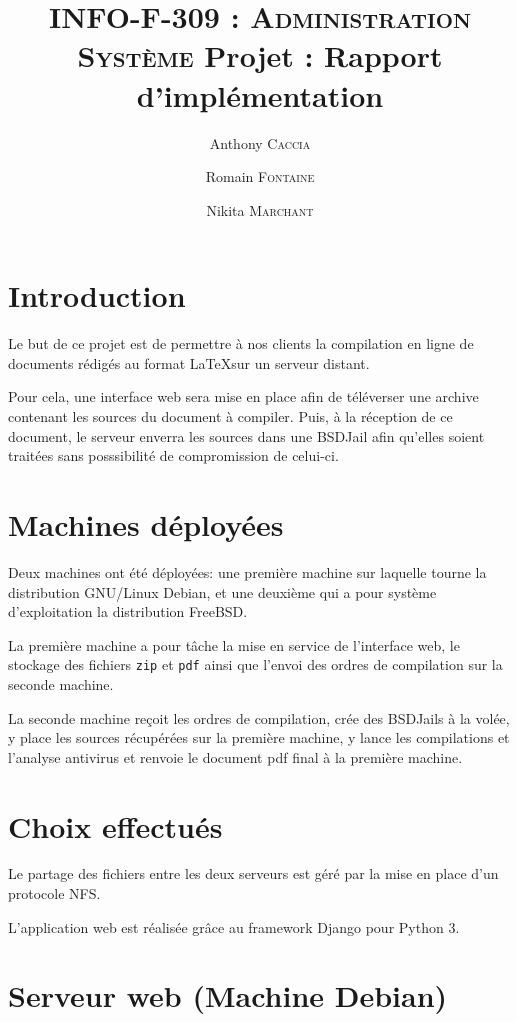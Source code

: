 \documentclass[10pt,a4paper]{article}
\author{Anthony \textsc{Caccia} \and Romain \textsc{Fontaine} \and Nikita \textsc{Marchant} }
\date{}
\title{\textsc{INFO-F-309 : Administration Système} Projet : Rapport d'implémentation}
\begin{document}
\maketitle

\tableofcontents
\newpage

\section{Introduction}
\label{sec:Introduction}

Le but de ce projet est de permettre à nos clients la compilation en ligne de documents rédigés au format \LaTeX sur un serveur distant.

Pour cela, une interface web sera mise en place afin de téléverser une archive contenant les sources du document à compiler.
Puis, à la réception de ce document, le serveur enverra les sources dans une BSDJail afin qu'elles soient traitées sans posssibilité de compromission de celui-ci.

\section{Machines déployées}
\label{sec:Machines déployées}

Deux machines ont été déployées: une première machine sur laquelle tourne la distribution GNU/Linux Debian, et une deuxième qui a pour système d'exploitation la distribution FreeBSD.

La première machine a pour tâche la mise en service de l'interface web,
le stockage des fichiers \texttt{zip} et \texttt{pdf}
ainsi que l'envoi des ordres de compilation sur la seconde machine.

La seconde machine reçoit les ordres de compilation, crée des BSDJails à la volée, y place les sources récupérées sur la première machine,
y lance les compilations et l'analyse antivirus et renvoie le document pdf final à la première machine.

\section{Choix effectués}
\label{sec:Choix effectués}

Le partage des fichiers entre les deux serveurs est géré par la mise en place d'un protocole NFS.

L'application web est réalisée grâce au framework Django pour Python 3.

\section{Serveur web (Machine Debian)}
\end{document}
